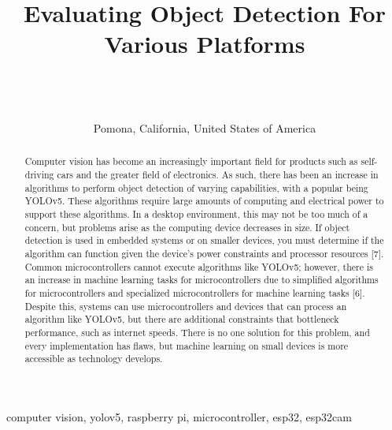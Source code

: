 \documentclass[Report]{IEEEtran}
\begin{document}
\title{Evaluating Object Detection For Various Platforms}

\author{
\\
\\
\\
Pomona, California, United States of America
}

\maketitle

\begin{abstract}
Computer vision has become an increasingly important field for products such as self-driving cars and the greater field of electronics. As such, there has been an increase in algorithms to perform object detection of varying capabilities, with a popular being YOLOv5. These algorithms require large amounts of computing and electrical power to support these algorithms. In a desktop environment, this may not be too much of a concern, but problems arise as the computing device decreases in size. If object detection is used in embedded systems or on smaller devices, you must determine if the algorithm can function given the device's power constraints and processor resources [7]. Common microcontrollers cannot execute algorithms like YOLOv5; however, there is an increase in machine learning tasks for microcontrollers due to simplified algorithms for microcontrollers and specialized microcontrollers for machine learning tasks [6]. Despite this, systems can use microcontrollers and devices that can process an algorithm like YOLOv5, but there are additional constraints that bottleneck performance, such as internet speeds. There is no one solution for this problem, and every implementation has flaws, but machine learning on small devices is more accessible as technology develops.
\end{abstract}

\begin{IEEEkeywords}
computer vision, yolov5, raspberry pi, microcontroller, esp32, esp32cam
\end{IEEEkeywords}
\end{document}
